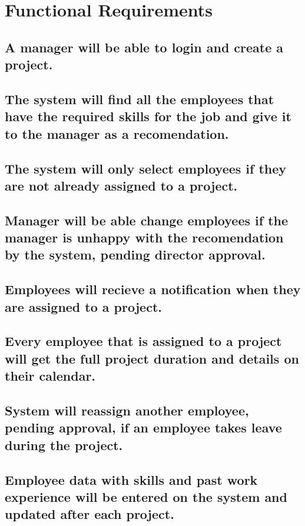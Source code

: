 \documentclass{article}
\begin{document}
\section{Functional Requirements}
	\subsection{A manager will be able to login and create a project.}
	
	\subsection{The system will find all the employees that have the required skills for the job and give it to the manager as a recomendation. }
	
	\subsection{The system will only select employees if they are not already assigned to a project.}
	
	\subsection{Manager will be able change employees if the manager is unhappy with the recomendation by the system, pending director approval.}
	
	\subsection{Employees will recieve a notification when they are assigned to a project. }
	
	\subsection{Every employee that is assigned to a project will get
		the full project duration and details on their calendar. }
	
	\subsection{System will reassign another employee, pending 
		approval, if an employee takes leave during the project.}
	
	\subsection{Employee data with skills and past work experience
		will be entered on the system and updated after each
		project. }
	
\end{document}
